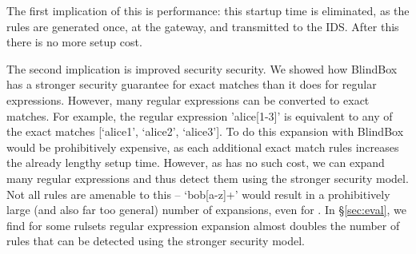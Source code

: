 The first implication of this is performance: this startup time is eliminated, as the rules are generated once, at the gateway, and transmitted to the IDS. After this there is no more setup cost.

The second implication is improved security security. We showed how BlindBox has a stronger security guarantee for exact matches than it does for regular expressions. However, many regular expressions can be converted to exact matches. 
For example, the regular expression 'alice[1-3]' is equivalent to any of the exact matches [`alice1', `alice2', `alice3'].
To do this expansion with BlindBox would be prohibitively expensive, as each additional exact match rules increases the already lengthy setup time.
However, as \sys has no such cost, we can expand many regular expressions and thus detect them using the stronger security model.
Not all rules are amenable to this -- \eg{} `bob[a-z]+' would result in a prohibitively large (and also far too general) number of expansions, even for \sys. 
In \S\ref{sec:eval}, we find for some rulsets regular expression expansion almost doubles the number of rules that can be detected using the stronger security model.




